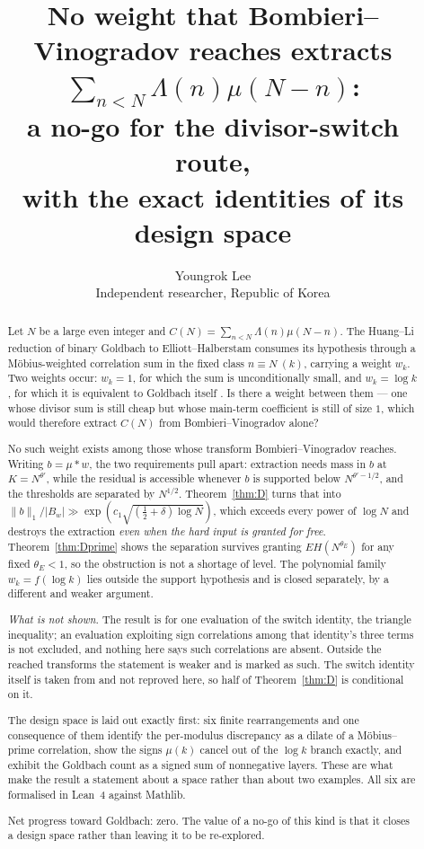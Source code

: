 \documentclass[11pt,a4paper]{article}
\title{No weight that Bombieri--Vinogradov reaches extracts
$\sum_{n<N}\Lambda(n)\mu(N-n)$:\\
a no-go for the divisor-switch route,\\
with the exact identities of its design space}
\author{Youngrok Lee\\
\small Independent researcher, Republic of Korea}
\date{}
\theoremstyle{plain}
\theoremstyle{definition}
\theoremstyle{remark}
\begin{document}
\maketitle

\begin{abstract}
Let $N$ be a large even integer and
$C(N)=\sum_{n<N}\Lambda(n)\mu(N-n)$. The Huang--Li reduction of binary
Goldbach to Elliott--Halberstam \cite{HL} consumes its hypothesis
through a M\"obius-weighted correlation sum in the fixed class
$n\equiv N\ (k)$, carrying a weight $w_k$. Two weights occur: $w_k=1$,
for which the sum is unconditionally small, and $w_k=\log k$, for which
it is equivalent to Goldbach itself \cite{P1}. Is there a weight
between them --- one whose divisor sum is still cheap but whose
main-term coefficient is still of size $1$, which would therefore
extract $C(N)$ from Bombieri--Vinogradov alone?

No such weight exists among those whose transform
Bombieri--Vinogradov reaches. Writing $b=\mu*w$, the two requirements
pull apart: extraction needs mass in $b$ at $K=N^{\theta'}$, while the
residual is accessible whenever $b$ is supported below
$N^{\theta'-1/2}$, and the thresholds are separated by $N^{1/2}$.
Theorem~\ref{thm:D} turns that into
$\lVert b\rVert_1/\lvert B_w\rvert\gg\exp(c_1\sqrt{(\frac12+\delta)\log
N})$, which exceeds every power of $\log N$ and destroys the extraction
\emph{even when the hard input is granted for free}.
Theorem~\ref{thm:Dprime} shows the separation survives granting
$EH(N^{\theta_E})$ for any fixed $\theta_E<1$, so the obstruction is
not a shortage of level. The polynomial family $w_k=f(\log k)$ lies
outside the support hypothesis and is closed separately, by a different
and weaker argument.

\emph{What is not shown.} The result is for one evaluation of the
switch identity, the triangle inequality; an evaluation exploiting sign
correlations among that identity's three terms is not excluded, and
nothing here says such correlations are absent. Outside the reached
transforms the statement is weaker and is marked as such. The switch
identity itself is taken from \cite{P1} and not reproved here, so half
of Theorem~\ref{thm:D} is conditional on it.

The design space is laid out exactly first: six finite rearrangements
and one consequence of them identify the per-modulus discrepancy as a
dilate of a M\"obius--prime correlation, show the signs $\mu(k)$ cancel
out of the $\log k$ branch exactly, and exhibit the Goldbach count as a
signed sum of nonnegative layers. These are what make the result a
statement about a space rather than about two examples. All six are
formalised in Lean~4 against Mathlib.

Net progress toward Goldbach: zero. The value of a no-go of this kind
is that it closes a design space rather than leaving it to be
re-explored.
\end{abstract}
\end{document}
